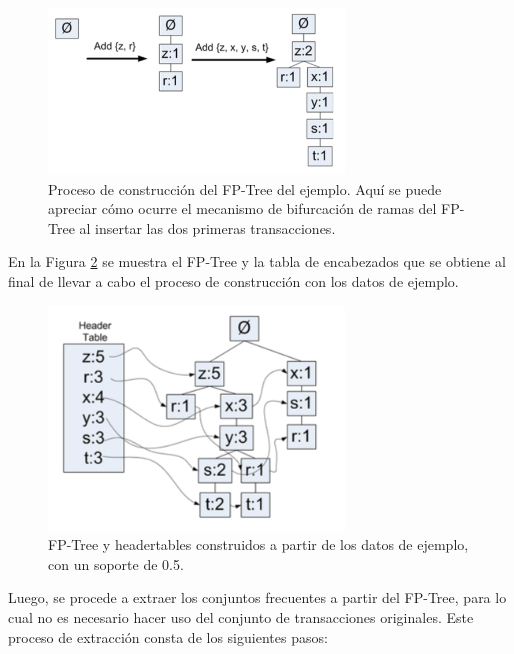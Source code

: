\begin{figure}[h!]
\begin{center}
\includegraphics[width=0.7\textwidth]{imagenes/fptree_process.png}
\end{center}
\vspace*{-5mm}
\caption{Proceso de construcción del FP-Tree del ejemplo. Aquí se puede apreciar cómo ocurre el mecanismo de bifurcación de ramas del FP-Tree al insertar las dos primeras transacciones\cite{harrington2012machine}.}
\label{fig:fptree_process}
\end{figure}

En la Figura \ref{fig:fptree_header} se muestra el FP-Tree y la tabla de encabezados que se obtiene al final de llevar a cabo el proceso de construcción con los datos de ejemplo.

\begin{figure}[h!]
\begin{center}
\includegraphics[width=0.7\textwidth]{imagenes/fptree_header.png}
\end{center}
\vspace*{-5mm}
\caption{FP-Tree y headertables construidos a partir de los datos de ejemplo, con un soporte de 0.5\cite{harrington2012machine}.}
\label{fig:fptree_header}
\end{figure}

Luego, se procede a extraer los conjuntos frecuentes a partir del FP-Tree, para lo cual no es necesario hacer uso del conjunto de transacciones originales. Este proceso de extracción consta de los siguientes pasos:

